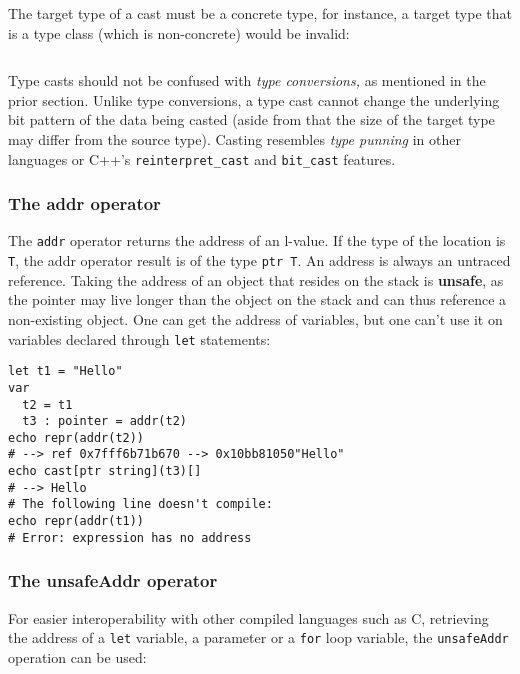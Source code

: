 The target type of a cast must be a concrete type, for instance, a
target type that is a type class (which is non-concrete) would be
invalid:

\begin{verbatim}
\end{verbatim}

Type casts should not be confused with \emph{type conversions,} as
mentioned in the prior section. Unlike type conversions, a type cast
cannot change the underlying bit pattern of the data being casted (aside
from that the size of the target type may differ from the source type).
Casting resembles \emph{type punning} in other languages or C++'s
\texttt{reinterpret\_cast} and \texttt{bit\_cast} features.

\hypertarget{the-addr-operator}{%
\subsubsection{The addr operator}\label{the-addr-operator}}

The \texttt{addr} operator returns the address of an l-value. If the
type of the location is \texttt{T}, the {addr} operator result is of the
type \texttt{ptr\ T}. An address is always an untraced reference. Taking
the address of an object that resides on the stack is \textbf{unsafe},
as the pointer may live longer than the object on the stack and can thus
reference a non-existing object. One can get the address of variables,
but one can't use it on variables declared through \texttt{let}
statements:

\begin{verbatim}
let t1 = "Hello"
var
  t2 = t1
  t3 : pointer = addr(t2)
echo repr(addr(t2))
# --> ref 0x7fff6b71b670 --> 0x10bb81050"Hello"
echo cast[ptr string](t3)[]
# --> Hello
# The following line doesn't compile:
echo repr(addr(t1))
# Error: expression has no address
\end{verbatim}

\hypertarget{the-unsafeaddr-operator}{%
\subsubsection{The unsafeAddr operator}\label{the-unsafeaddr-operator}}

For easier interoperability with other compiled languages such as C,
retrieving the address of a \texttt{let} variable, a parameter or a
\texttt{for} loop variable, the \texttt{unsafeAddr} operation can be
used:

